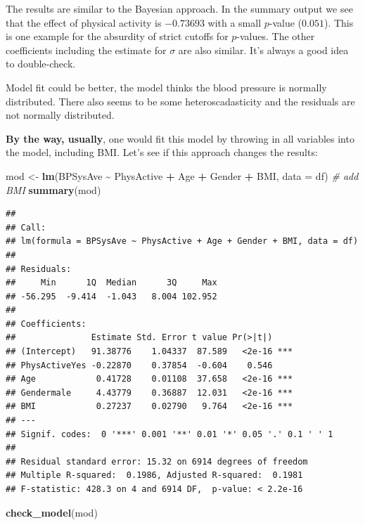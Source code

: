 \documentclass[
]{book}
\newenvironment{Shaded}{\begin{snugshade}}{\end{snugshade}}
\newcommand{\AttributeTok}[1]{\textcolor[rgb]{0.13,0.29,0.53}{#1}}
\newcommand{\CommentTok}[1]{\textcolor[rgb]{0.56,0.35,0.01}{\textit{#1}}}
\newcommand{\FunctionTok}[1]{\textcolor[rgb]{0.13,0.29,0.53}{\textbf{#1}}}
\newcommand{\NormalTok}[1]{#1}
\newcommand{\OtherTok}[1]{\textcolor[rgb]{0.56,0.35,0.01}{#1}}
\newcommand{\SpecialCharTok}[1]{\textcolor[rgb]{0.81,0.36,0.00}{\textbf{#1}}}
\begin{document}
The results are similar to the Bayesian approach.
In the summary output we see that the effect of physical activity is \(-0.73693\)
with a small \(p\)-value (\(0.051\)). This is one example for the absurdity of strict cutoffs
for \(p\)-values. The other coefficients including the estimate for \(\sigma\) are also similar.
It's always a good idea to double-check.

Model fit could be better, the model thinks the blood pressure is normally distributed.
There also seems to be some heteroscadasticity and the residuals are not normally distributed.

\textbf{By the way, usually}, one would fit this model by throwing in all variables into the model, including BMI.
Let's see if this approach changes the results:

\begin{Shaded}
\begin{Highlighting}[]
\NormalTok{mod }\OtherTok{\textless{}{-}} \FunctionTok{lm}\NormalTok{(BPSysAve }\SpecialCharTok{\textasciitilde{}}\NormalTok{ PhysActive }\SpecialCharTok{+}\NormalTok{ Age }\SpecialCharTok{+}\NormalTok{ Gender  }\SpecialCharTok{+}\NormalTok{ BMI, }\AttributeTok{data =}\NormalTok{ df) }\CommentTok{\# add BMI}
\FunctionTok{summary}\NormalTok{(mod)}
\end{Highlighting}
\end{Shaded}

\begin{verbatim}
## 
## Call:
## lm(formula = BPSysAve ~ PhysActive + Age + Gender + BMI, data = df)
## 
## Residuals:
##     Min      1Q  Median      3Q     Max 
## -56.295  -9.414  -1.043   8.004 102.952 
## 
## Coefficients:
##               Estimate Std. Error t value Pr(>|t|)    
## (Intercept)   91.38776    1.04337  87.589   <2e-16 ***
## PhysActiveYes -0.22870    0.37854  -0.604    0.546    
## Age            0.41728    0.01108  37.658   <2e-16 ***
## Gendermale     4.43779    0.36887  12.031   <2e-16 ***
## BMI            0.27237    0.02790   9.764   <2e-16 ***
## ---
## Signif. codes:  0 '***' 0.001 '**' 0.01 '*' 0.05 '.' 0.1 ' ' 1
## 
## Residual standard error: 15.32 on 6914 degrees of freedom
## Multiple R-squared:  0.1986, Adjusted R-squared:  0.1981 
## F-statistic: 428.3 on 4 and 6914 DF,  p-value: < 2.2e-16
\end{verbatim}

\begin{Shaded}
\begin{Highlighting}[]
\FunctionTok{check\_model}\NormalTok{(mod)}
\end{Highlighting}
\end{Shaded}
\end{document}
